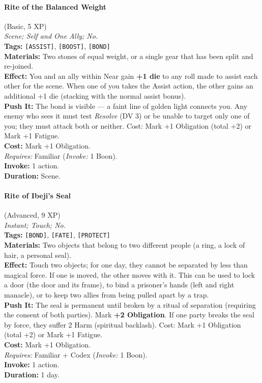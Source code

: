 \paragraph{Rite of the Balanced Weight} (Basic, 5 XP) \hfill \\
\emph{Scene; Self and One Ally; No.} \\
\textbf{Tags:} \texttt{[ASSIST]}, \texttt{[BOOST]}, \texttt{[BOND]} \\
\textbf{Materials:} Two stones of equal weight, or a single gear that has been split and re-joined. \\
\textbf{Effect:} You and an ally within Near gain \textbf{+1 die} to any roll made to assist each other for the scene. When one of you takes the Assist action, the other gains an additional +1 die (stacking with the normal assist bonus). \\
\textbf{Push It:} The bond is visible --- a faint line of golden light connects you. Any enemy who sees it must test \textit{Resolve} (DV 3) or be unable to target only one of you; they must attack both or neither. Cost: Mark +1 Obligation (total +2) or Mark +1 Fatigue. \\
\textbf{Cost:} Mark +1 Obligation. \\
\textit{Requires:} Familiar (\textit{Invoke:} 1 Boon). \\
\textbf{Invoke:} 1 action. \\
\textbf{Duration:} Scene.

\paragraph{Rite of Ibeji's Seal} (Advanced, 9 XP) \hfill \\
\emph{Instant; Touch; No.} \\
\textbf{Tags:} \texttt{[BOND]}, \texttt{[FATE]}, \texttt{[PROTECT]} \\
\textbf{Materials:} Two objects that belong to two different people (a ring, a lock of hair, a personal seal). \\
\textbf{Effect:} Touch two objects; for one day, they cannot be separated by less than magical force. If one is moved, the other moves with it. This can be used to lock a door (the door and its frame), to bind a prisoner's hands (left and right manacle), or to keep two allies from being pulled apart by a trap. \\
\textbf{Push It:} The seal is permanent until broken by a ritual of separation (requiring the consent of both parties). Mark \textbf{+2 Obligation}. If one party breaks the seal by force, they suffer 2 Harm (spiritual backlash). Cost: Mark +1 Obligation (total +2) or Mark +1 Fatigue. \\
\textbf{Cost:} Mark +1 Obligation. \\
\textit{Requires:} Familiar + Codex (\textit{Invoke:} 1 Boon). \\
\textbf{Invoke:} 1 action. \\
\textbf{Duration:} 1 day.

